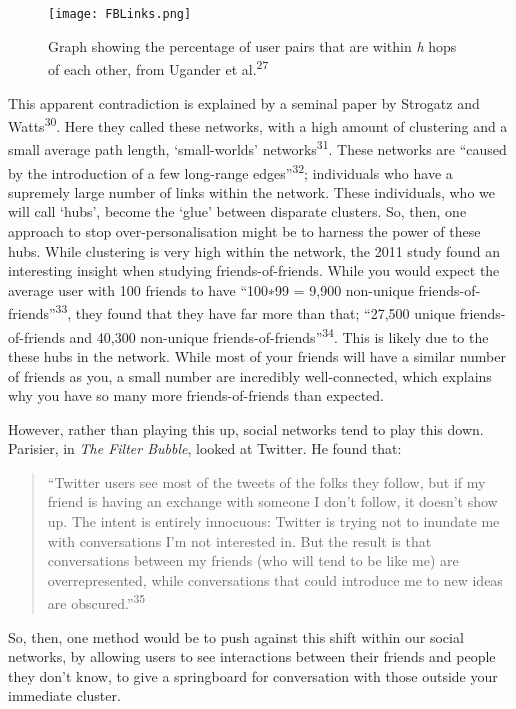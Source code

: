 \documentclass[]{article}
\begin{document}
\begin{figure}
\centering
\texttt{[image: FBLinks.png]}
\caption{Graph showing the percentage of user pairs that are within
\emph{h} hops of each other, from Ugander et al.\textsuperscript{27}}
\end{figure}

This apparent contradiction is explained by a seminal paper by Strogatz
and Watts\textsuperscript{30}. Here they called these networks, with a
high amount of clustering and a small average path length,
`small-worlds' networks\textsuperscript{31}. These networks are ``caused
by the introduction of a few long-range edges''\textsuperscript{32};
individuals who have a supremely large number of links within the
network. These individuals, who we will call `hubs', become the `glue'
between disparate clusters. So, then, one approach to stop
over-personalisation might be to harness the power of these hubs. While
clustering is very high within the network, the 2011 study found an
interesting insight when studying friends-of-friends. While you would
expect the average user with 100 friends to have ``100∗99 = 9,900
non-unique friends-of-friends''\textsuperscript{33}, they found that
they have far more than that; ``27,500 unique friends-of-friends and
40,300 non-unique friends-of-friends''\textsuperscript{34}. This is
likely due to the these hubs in the network. While most of your friends
will have a similar number of friends as you, a small number are
incredibly well-connected, which explains why you have so many more
friends-of-friends than expected.

However, rather than playing this up, social networks tend to play this
down. Parisier, in \emph{The Filter Bubble}, looked at Twitter. He found
that:

\begin{quote}
``Twitter users see most of the tweets of the folks they follow, but if
my friend is having an exchange with someone I don't follow, it doesn't
show up. The intent is entirely innocuous: Twitter is trying not to
inundate me with conversations I'm not interested in. But the result is
that conversations between my friends (who will tend to be like me) are
overrepresented, while conversations that could introduce me to new
ideas are obscured.''\textsuperscript{35}
\end{quote}

So, then, one method would be to push against this shift within our
social networks, by allowing users to see interactions between their
friends and people they don't know, to give a springboard for
conversation with those outside your immediate cluster.
\end{document}
